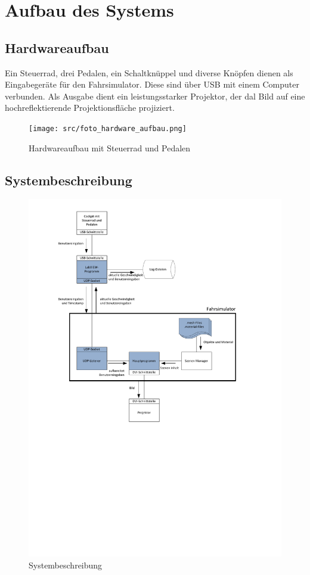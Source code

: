 \section{Aufbau des Systems}
\subsection{Hardwareaufbau}
Ein Steuerrad, drei Pedalen, ein Schaltknüppel und diverse Knöpfen dienen als Eingabegeräte für den Fahrsimulator. Diese sind über USB mit einem Computer verbunden. Als Ausgabe dient ein leistungsstarker Projektor, der dal Bild auf eine hochreflektierende Projektionsfläche projiziert.

\begin{figure}[H]
\centering 
\texttt{[image: src/foto\_hardware\_aufbau.png]}
\caption{Hardwareaufbau mit Steuerrad und Pedalen} %
\label{Hardwareaufbau} %
\end{figure}

\newpage

\subsection{Systembeschreibung}

\begin{figure}[H]
\centering 
\includegraphics[width=1\linewidth]{src/Systembeschreibung.pdf}
\caption{Systembeschreibung} %
\label{Systembeschreibung} %
\end{figure}

